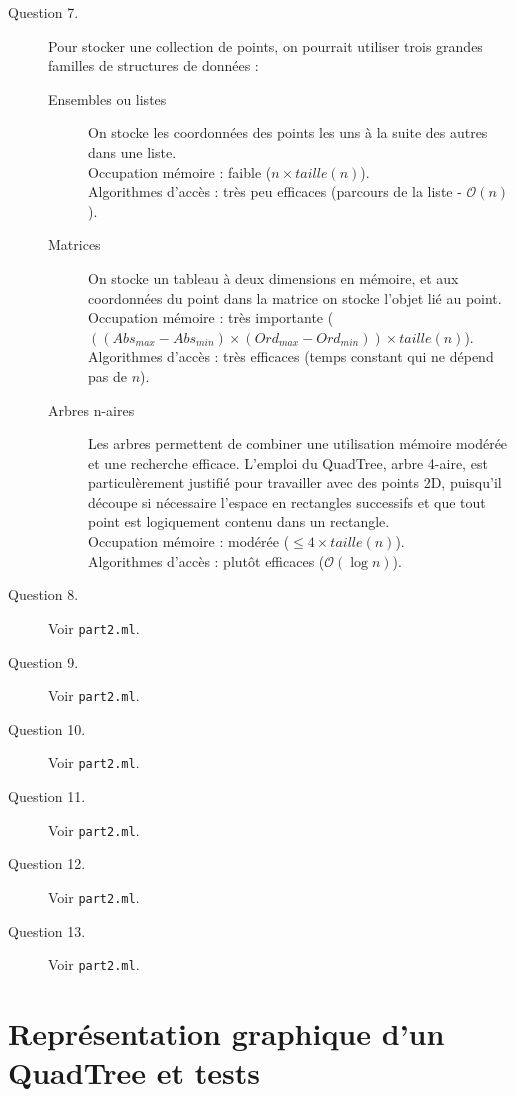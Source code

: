 \documentclass[11pt]{scrartcl}
\newcommand{\filename}[1]{\texttt{\textcolor{RawSienna}{#1}}}
\begin{document}
\begin{description}
\item[Question 7.] Pour stocker une collection de points, on pourrait utiliser trois grandes familles de structures de données :
\begin{description}
\item[Ensembles ou listes] On stocke les coordonnées des points les uns à la suite des autres dans une liste.\\
Occupation mémoire : faible ($n \times taille(n)$).\\
Algorithmes d'accès : très peu efficaces (parcours de la liste - $\mathcal{O}(n)$).
\item[Matrices] On stocke un tableau à deux dimensions en mémoire, et aux coordonnées du point dans la matrice on stocke l'objet lié au point.\\
Occupation mémoire : très importante ($((Abs_{max} - Abs_{min}) \times (Ord_{max} - Ord_{min})) \times taille(n)$).\\
Algorithmes d'accès : très efficaces (temps constant qui ne dépend pas de $n$).
\item[Arbres n-aires] Les arbres permettent de combiner une utilisation mémoire modérée et une recherche efficace. L'emploi du QuadTree, arbre 4-aire, est particulèrement justifié pour travailler avec des points 2D, puisqu'il découpe si nécessaire l'espace en rectangles successifs et que tout point est logiquement contenu dans un rectangle.\\
Occupation mémoire : modérée ($\leq 4 \times taille(n)$).\\
Algorithmes d'accès : plutôt efficaces ($\mathcal{O}(\log{}n)$).
\end{description}
\item[Question 8.] Voir \filename{part2.ml}.
\item[Question 9.] Voir \filename{part2.ml}.
\item[Question 10.] Voir \filename{part2.ml}.
\item[Question 11.] Voir \filename{part2.ml}.
\item[Question 12.] Voir \filename{part2.ml}.
\item[Question 13.] Voir \filename{part2.ml}.
\end{description}

\section{Représentation graphique d'un QuadTree et tests}
\end{document}
